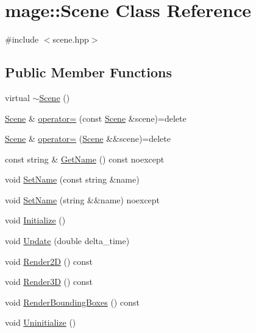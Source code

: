 \hypertarget{classmage_1_1_scene}{}\section{mage\+:\+:Scene Class Reference}
\label{classmage_1_1_scene}


{\ttfamily \#include $<$scene.\+hpp$>$}

\subsection*{Public Member Functions}
\begin{DoxyCompactItemize}
\item 
virtual \hyperlink{classmage_1_1_scene_adc40910fdca62586659c2961fe7e7f3c}{$\sim$\+Scene} ()
\item 
\hyperlink{classmage_1_1_scene}{Scene} \& \hyperlink{classmage_1_1_scene_a2c25c0fedc0230771d8c00a8288a69ce}{operator=} (const \hyperlink{classmage_1_1_scene}{Scene} \&scene)=delete
\item 
\hyperlink{classmage_1_1_scene}{Scene} \& \hyperlink{classmage_1_1_scene_a400926762670c9cd9b6d456291600f53}{operator=} (\hyperlink{classmage_1_1_scene}{Scene} \&\&scene)=delete
\item 
const string \& \hyperlink{classmage_1_1_scene_a6afd25c30d08eb579eb430af49cf8fc0}{Get\+Name} () const noexcept
\item 
void \hyperlink{classmage_1_1_scene_a9b7c1c2f84cc3b3c5ff3de4f29d830e9}{Set\+Name} (const string \&name)
\item 
void \hyperlink{classmage_1_1_scene_a86b2e6e764ee134af1706f90603a6596}{Set\+Name} (string \&\&name) noexcept
\item 
void \hyperlink{classmage_1_1_scene_a3cd12ef381ca743bf0b8f8aa2a76eb57}{Initialize} ()
\item 
void \hyperlink{classmage_1_1_scene_aa10e6eafc00834f63f146589326cbfe2}{Update} (double delta\+\_\+time)
\item 
void \hyperlink{classmage_1_1_scene_a53487349d68f0ffcc91b243d0cfb86a3}{Render2D} () const
\item 
void \hyperlink{classmage_1_1_scene_a51d2d441067d30cf3a444d6a80811f93}{Render3D} () const
\item 
void \hyperlink{classmage_1_1_scene_a522bdeaff61129f6df93345a3eef693f}{Render\+Bounding\+Boxes} () const
\item 
void \hyperlink{classmage_1_1_scene_a714dc33c04dc2b8e2cec93564905b174}{Uninitialize} ()
\item 

\end{DoxyCompactItemize}
